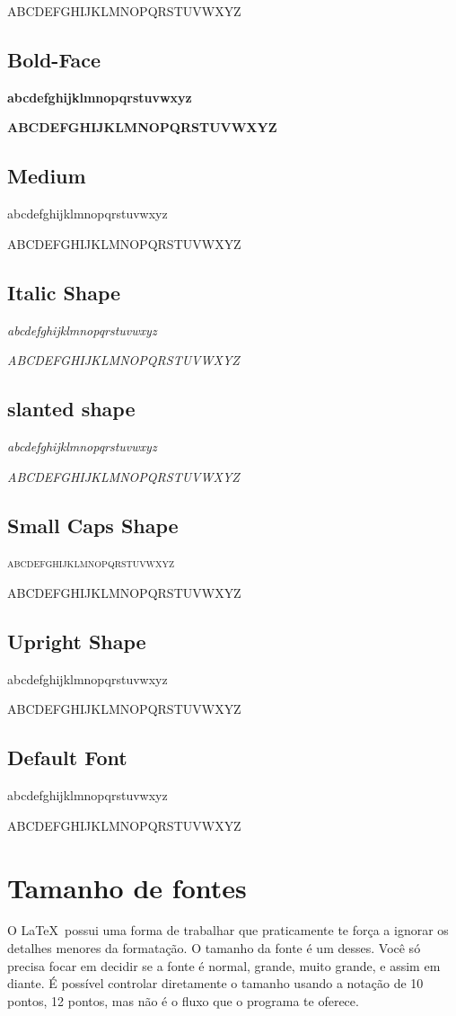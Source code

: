 \textrm{ABCDEFGHIJKLMNOPQRSTUVWXYZ}

\subsection{Bold-Face}
\textbf{abcdefghijklmnopqrstuvwxyz}

\textbf{ABCDEFGHIJKLMNOPQRSTUVWXYZ}

\subsection{Medium}
\textmd{abcdefghijklmnopqrstuvwxyz}

\textmd{ABCDEFGHIJKLMNOPQRSTUVWXYZ}

\subsection{Italic Shape}
\textit{abcdefghijklmnopqrstuvwxyz}

\textit{ABCDEFGHIJKLMNOPQRSTUVWXYZ}

\subsection{slanted shape}
\textsl{abcdefghijklmnopqrstuvwxyz}

\textsl{ABCDEFGHIJKLMNOPQRSTUVWXYZ}

\subsection{Small Caps Shape}
\textsc{abcdefghijklmnopqrstuvwxyz}

\textsc{ABCDEFGHIJKLMNOPQRSTUVWXYZ}

\subsection{Upright Shape}
\textup{abcdefghijklmnopqrstuvwxyz}

\textup{ABCDEFGHIJKLMNOPQRSTUVWXYZ}

\subsection{Default Font}
\textnormal{abcdefghijklmnopqrstuvwxyz}

\textnormal{ABCDEFGHIJKLMNOPQRSTUVWXYZ}

\section{Tamanho de fontes}
O \LaTeX\ possui uma forma de trabalhar que praticamente te força a ignorar os detalhes menores da formatação.
O tamanho da fonte é um desses.
Você só precisa focar em decidir se a fonte é normal, grande, muito grande, e assim em diante.
É possível controlar diretamente o tamanho usando a notação de 10 pontos, 12 pontos, mas não é o fluxo que o programa te oferece.

